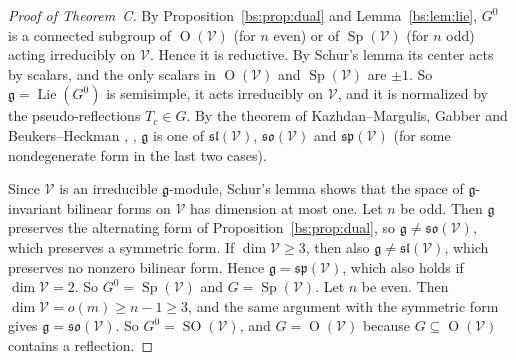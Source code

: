 \documentclass[11pt,a4paper]{article}
\theoremstyle{definition}
\theoremstyle{remark}
\numberwithin{equation}{section}
\DeclareMathOperator{\SO}{SO}
\DeclareMathOperator{\Ort}{O}
\DeclareMathOperator{\Sp}{Sp}
\DeclareMathOperator{\Lie}{Lie}
\begin{document}
\begin{proof}[Proof of Theorem~C]
By Proposition~\ref{bs:prop:dual} and Lemma~\ref{bs:lem:lie}, $G^0$ is a connected subgroup of $\Ort(\mathcal V)$ (for $n$ even) or of $\Sp(\mathcal V)$ (for $n$ odd) acting irreducibly on $\mathcal V$. Hence it is reductive. By Schur's lemma its center acts by scalars, and the only scalars in $\Ort(\mathcal V)$ and $\Sp(\mathcal V)$ are $\pm1$. So $\mathfrak g=\Lie(G^0)$ is semisimple, it acts irreducibly on $\mathcal V$, and it is normalized by the pseudo-reflections $T_c\in G$. By the theorem of Kazhdan--Margulis, Gabber and Beukers--Heckman \cite[Thm.~1.5]{Kat90}, \cite{BH89}, $\mathfrak g$ is one of $\mathfrak{sl}(\mathcal V)$, $\mathfrak{so}(\mathcal V)$ and $\mathfrak{sp}(\mathcal V)$ (for some nondegenerate form in the last two cases).

Since $\mathcal V$ is an irreducible $\mathfrak g$-module, Schur's lemma shows that the space of $\mathfrak g$-invariant bilinear forms on $\mathcal V$ has dimension at most one. Let $n$ be odd. Then $\mathfrak g$ preserves the alternating form of Proposition~\ref{bs:prop:dual}, so $\mathfrak g\ne\mathfrak{so}(\mathcal V)$, which preserves a symmetric form. If $\dim\mathcal V\ge3$, then also $\mathfrak g\ne\mathfrak{sl}(\mathcal V)$, which preserves no nonzero bilinear form. Hence $\mathfrak g=\mathfrak{sp}(\mathcal V)$, which also holds if $\dim\mathcal V=2$. So $G^0=\Sp(\mathcal V)$ and $G=\Sp(\mathcal V)$. Let $n$ be even. Then $\dim\mathcal V=o(m)\ge n-1\ge3$, and the same argument with the symmetric form gives $\mathfrak g=\mathfrak{so}(\mathcal V)$. So $G^0=\SO(\mathcal V)$, and $G=\Ort(\mathcal V)$ because $G\subseteq\Ort(\mathcal V)$ contains a reflection.
\end{proof}
\end{document}
